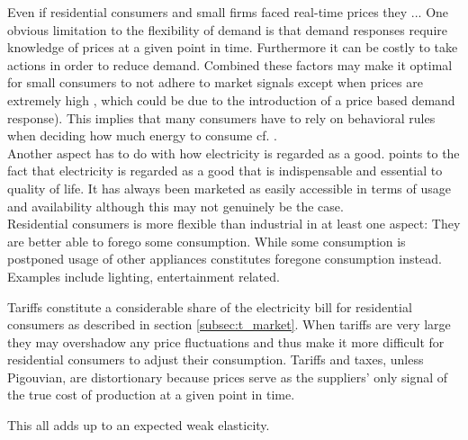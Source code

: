 Even if residential consumers and small firms faced real-time prices they ...
One obvious limitation to the flexibility of demand is that demand responses require knowledge of prices at a given point in time. Furthermore it can be costly to take actions in order to reduce demand. Combined these factors may make it optimal for small consumers to not adhere to market signals except when prices are extremely high \citep{wolak2011residential}, which could be due to the introduction of a price based demand response). This implies that many consumers have to rely on behavioral rules when deciding how much energy to consume cf. \citep{kirschen2003demand}.
\smallskip \\
 Another aspect has to do with how electricity is regarded as a good. \citet{kirschen2003demand} points to the fact that electricity is regarded as a good that is indispensable and essential to quality of life. It has always been marketed as easily accessible in terms of usage and availability although this may not genuinely be the case.
 \smallskip \\

 Residential consumers is more flexible than industrial in at least one aspect: They are better able to forego some consumption. While some consumption is postponed usage of other appliances constitutes foregone consumption instead. Examples include lighting, entertainment related.

Tariffs constitute a considerable share of the electricity bill for residential consumers as described in section \ref{subsec:t_market}. When tariffs are very large they may overshadow any price fluctuations and thus make it more difficult for residential consumers to adjust their consumption. Tariffs and taxes, unless Pigouvian, are distortionary because prices serve as the suppliers' only signal of the true cost of production at a given point in time.

This all adds up to an expected weak elasticity.

